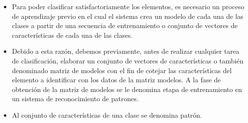 \documentclass[xcolor=x11names,compress]{beamer}
\theoremstyle{cuadrado}
\begin{document}
{{\begin{itemize}
\item Para poder clasificar satisfactoriamente los elementos, es necesario un proceso de aprendizaje previo en el cual el sistema crea un modelo de cada una de las clases a partir de una secuencia de entrenamiento o conjunto de vectores de características de cada una de las clases.

\item Debido a esta razón, debemos previamente, antes de realizar cualquier tarea de clasificación, elaborar un conjunto de vectores de características o también denominado matriz de modelos con el fin de cotejar las características del elemento a identificar con los datos de la matriz modelos. A la fase de obtención de la matriz de modelos se le denomina etapa de entrenamiento en un sistema de reconocimiento de patrones.

\item Al conjunto de características de una clase se denomina patrón. 

\end{itemize}
}


}
\end{document}
